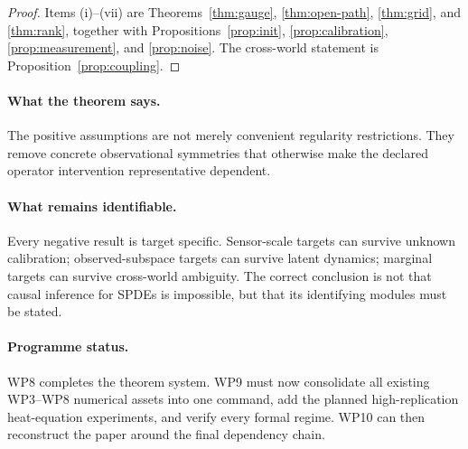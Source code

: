 \documentclass[11pt]{article}
\theoremstyle{remark}
\begin{document}
\begin{proof}
Items (i)--(vii) are Theorems~\ref{thm:gauge}, \ref{thm:open-path}, \ref{thm:grid}, and \ref{thm:rank}, together with Propositions~\ref{prop:init}, \ref{prop:calibration}, \ref{prop:measurement}, and \ref{prop:noise}. The cross-world statement is Proposition~\ref{prop:coupling}.
\end{proof}

\paragraph{What the theorem says.}
The positive assumptions are not merely convenient regularity restrictions. They remove concrete observational symmetries that otherwise make the declared operator intervention representative dependent.

\paragraph{What remains identifiable.}
Every negative result is target specific. Sensor-scale targets can survive unknown calibration; observed-subspace targets can survive latent dynamics; marginal targets can survive cross-world ambiguity. The correct conclusion is not that causal inference for SPDEs is impossible, but that its identifying modules must be stated.

\paragraph{Programme status.}
WP8 completes the theorem system. WP9 must now consolidate all existing WP3--WP8 numerical assets into one command, add the planned high-replication heat-equation experiments, and verify every formal regime. WP10 can then reconstruct the paper around the final dependency chain.
\end{document}
